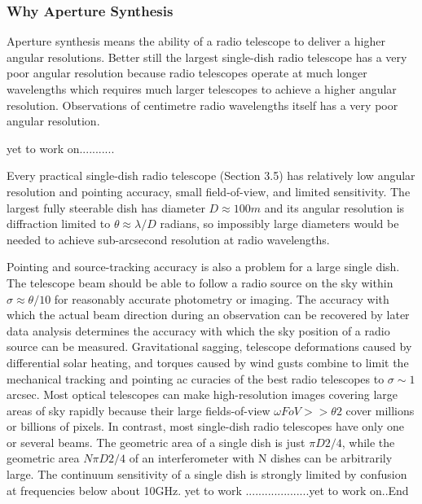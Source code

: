 {%





\subsubsection{Why Aperture Synthesis}
 Aperture synthesis means the ability of a radio telescope to deliver a higher angular resolutions.
 Better still the largest single-dish radio telescope has a very poor angular resolution because radio telescopes operate at much longer wavelengths which requires much larger telescopes to achieve a higher angular resolution.
 Observations of  centimetre radio wavelengths itself has a very poor angular resolution.
 
 yet to work on........... 
 
 Every practical single-dish radio telescope (Section 3.5) has relatively low angular resolution and pointing accuracy, small field-of-view, and limited sensitivity. The largest fully steerable dish has diameter \(D\approx100 m\) and its angular resolution is diffraction limited to \(\theta\approx\lambda/D\) radians, so impossibly large diameters would be needed to achieve sub-arcsecond resolution at radio wavelengths. 
 
 Pointing and source-tracking accuracy is also a problem for a large single dish. The telescope beam should be able to follow a radio source on the sky within \(\sigma\approx\theta/10\) for reasonably accurate photometry or imaging. The accuracy with which the actual beam direction during an observation can be recovered by later data analysis determines the accuracy with which the sky position of a radio source can be measured. Gravitational sagging, telescope deformations caused by differential solar heating, and torques caused by wind gusts combine to limit the mechanical tracking and pointing ac curacies of the best radio telescopes to \(\sigma\sim1\) arcsec.
 Most optical telescopes can make high-resolution images covering large areas of sky rapidly because their large fields-of-view \(\omega FoV>> \theta 2\) cover millions or billions of pixels. In contrast, most single-dish radio telescopes have only one or several beams. The geometric area of a single dish is just \(\pi D2/4\), while the geometric area \(N\pi D2/4\) of an interferometer with N dishes can be arbitrarily large. The continuum sensitivity of a single dish is strongly limited by confusion at frequencies below about 10GHz.
 yet to work ....................yet to work on..End
 
}
